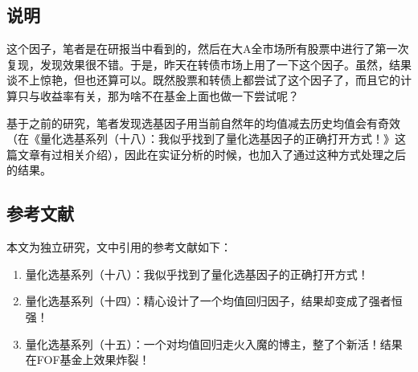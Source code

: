 \documentclass{article}
\begin{document}
\subsection{说明}
这个因子，笔者是在研报当中看到的，然后在大A全市场所有股票中进行了第一次复现，发现效果很不错。于是，昨天在转债市场上用了一下这个因子。虽然，结果谈不上惊艳，但也还算可以。既然股票和转债上都尝试了这个因子了，而且它的计算只与收益率有关，那为啥不在基金上面也做一下尝试呢？

基于之前的研究，笔者发现选基因子用当前自然年的均值减去历史均值会有奇效（在《量化选基系列（十八）：我似乎找到了量化选基因子的正确打开方式！》这篇文章有过相关介绍），因此在实证分析的时候，也加入了通过这种方式处理之后的结果。

\subsection{参考文献}
本文为独立研究，文中引用的参考文献如下：
\begin{enumerate}
    \item 量化选基系列（十八）：我似乎找到了量化选基因子的正确打开方式！
    \item 量化选基系列（十四）：精心设计了一个均值回归因子，结果却变成了强者恒强！
    \item 量化选基系列（十五）：一个对均值回归走火入魔的博主，整了个新活！结果在FOF基金上效果炸裂！
\end{enumerate}
\end{document}
